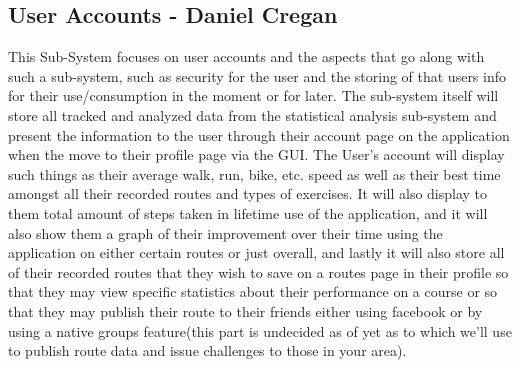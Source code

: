 ﻿\documentclass{article}
\begin{document}

\newpage

\subsection{User Accounts - Daniel Cregan}
This Sub-System focuses on user accounts and the aspects that go along with such a sub-system, such as security for the user and the storing of that users info for their use/consumption in the moment or for later.
The sub-system itself will store all tracked and analyzed data from the statistical analysis sub-system and present the information to the user through their account page on the application when the move to their profile page via the GUI. The User's account will display such things as their average walk, run, bike, etc. speed as well as their best time amongst all their recorded routes and types of exercises. It will also display to them total amount of steps taken in lifetime use of the application, and it will also show them a graph of their improvement over their time using the application on either certain routes or just overall, and lastly it will also store all of their recorded routes that they wish to save on a routes page in their profile so that they may view specific statistics about their performance on a course or so that they may publish their route to their friends either using facebook or by using a native groups feature(this part is undecided as of yet as to which we’ll use to publish route data and issue challenges to those in your area).
\end{document}
